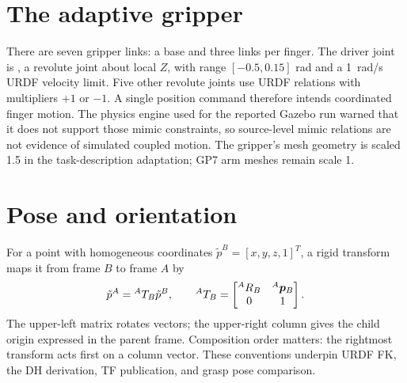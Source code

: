 \section{The adaptive gripper}
There are seven gripper links: a base and three links per finger. The driver
joint is , a revolute joint about local $Z$, with range
$[-0.5,0.15]$ rad and a \SI{1}{rad/s} URDF velocity limit. Five other revolute
joints use URDF  relations with multipliers $+1$ or $-1$. A single
position command therefore intends coordinated finger motion. The physics
engine used for the reported Gazebo run warned that it does not support those
mimic constraints, so source-level mimic relations are not evidence of
simulated coupled motion. The gripper's mesh geometry is scaled 1.5 in the
task-description adaptation; GP7 arm meshes remain scale 1.

\section{Pose and orientation}
For a point with homogeneous coordinates $\tilde p^B=[x,y,z,1]^T$, a rigid
transform maps it from frame $B$ to frame $A$ by
\begin{equation}
 \tilde p^A={}^{A}T_{B}\tilde p^B,\qquad
 {}^{A}T_B=\begin{bmatrix}{}^{A}R_B&{}^{A}\bm{p}_B\\0&1\end{bmatrix}.
\end{equation}
The upper-left matrix rotates vectors; the upper-right column gives the child
origin expressed in the parent frame. Composition order matters: the rightmost
transform acts first on a column vector. These conventions underpin URDF FK,
the DH derivation, TF publication, and grasp pose comparison.
